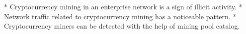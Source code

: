 * Cryptocurrency mining in an enterprise network is a sign of illicit activity.
* Network traffic related to cryptocurrency mining has a noticeable pattern.
* Cryptocurrency miners can be detected with the help of mining pool catalog.
